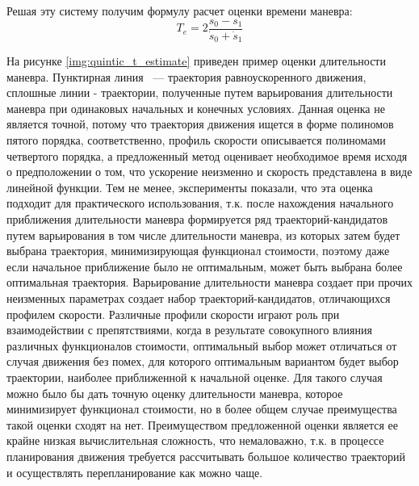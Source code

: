 Решая эту систему получим формулу расчет оценки времени маневра:
\begin{equation}
      T_e = 2\frac{s_0 - s_1}{\dot{s}_0 + \dot{s}_1}
\end{equation}

На рисунке \ref{img:quintic_t_estimate} приведен пример оценки длительности маневра. Пунктирная линия ~---
траектория равноускоренного движения, сплошные линии - траектории, полученные путем варьирования длительности
маневра при одинаковых начальных и конечных условиях. Данная оценка не является точной, потому что траектория движения
ищется в форме полиномов пятого порядка, соответственно, профиль скорости описывается полиномами четвертого порядка,
а предложенный метод оценивает необходимое время исходя о предположении о том, что ускорение неизменно и скорость
представлена в виде линейной функции. Тем не менее, эксперименты показали, что эта оценка подходит для практического
использования, т.к. после нахождения начального приближения длительности маневра формируется ряд траекторий-кандидатов
путем варьирования в том числе длительности маневра, из которых затем будет выбрана траектория, минимизирующая
функционал стоимости, поэтому даже если начальное приближение было не оптимальным, может быть выбрана более оптимальная
траектория. Варьирование длительности маневра создает при прочих неизменных параметрах создает набор
траекторий-кандидатов, отличающихся профилем скорости. Различные профили скорости играют роль при взаимодействии
с препятствиями, когда в результате совокупного влияния различных функционалов стоимости, оптимальный выбор может
отличаться от случая движения без помех, для которого оптимальным вариантом будет выбор траектории, наиболее
приближенной к начальной оценке. Для такого случая можно было бы дать точную оценку длительности маневра, которое
минимизирует функционал стоимости, но в более общем случае преимущества такой оценки сходят на нет. Преимуществом
предложенной оценки является ее крайне низкая вычислительная сложность, что немаловажно, т.к. в процессе планирования
движения требуется рассчитывать большое количество траекторий и осуществлять перепланирование как можно чаще.

